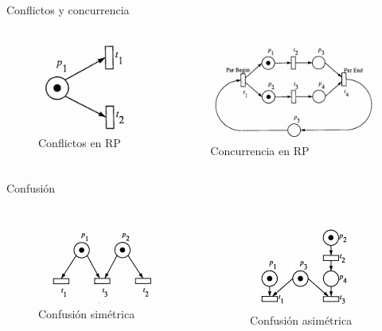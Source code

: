 \documentclass[
compress,
xcolor=table,
dvipsnames,
]{beamer}
\begin{document}

\begin{frame}{Conflictos y concurrencia}
  \begin{columns}
    \begin{figure}[h]
        \includegraphics[scale=0.7]{graphics/rp_conflicts.png}
        \caption{Conflictos en RP \citep{Murata:89}}
    \end{figure}
        \begin{figure}[h]
            \includegraphics[scale=0.7]{graphics/rp_concurrency.png}
            \caption{Concurrencia en RP \citep{Murata:89}}
        \end{figure}
  \end{columns}
\end{frame}


\begin{frame}{Confusión}
  \begin{columns}
    \begin{figure}[h]
        \includegraphics[scale=1]{graphics/symmetric_confusion.png}
        \caption{Confusión simétrica \citep{Murata:89}}
    \end{figure}
        \begin{figure}[h]
            \includegraphics[scale=1]{graphics/asymmetric_confusion.png}
            \caption{Confusión asimétrica \citep{Murata:89}}
        \end{figure}
  \end{columns}
\end{frame}
\end{document}
